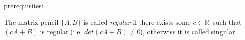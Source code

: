 	\begin{frame}
		prerequisites: \\
		\begin{definition}
			The matrix pencil $\{ A,B\}$ is called \emph{regular} if there exists some $c \in \mathbb{R}$, such that $(cA+B)$ is regular (i.e. $det(cA+B) \neq 0$), otherwise it is called singular.
		\end{definition}
	\end{frame}
	
	
